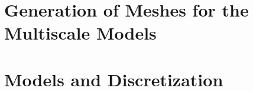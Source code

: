 


\graphicspath{
{images/summer_school_study/png/}
{images/summer_school_study/}
{images/summer_school_study/plots/}
{images/summer_school_study/2018/}
{images/fiber_creation/}
{images/parallel_fiber_estimation/}
{images/motor_unit_assignment/}
{images/implementation/}
{images/theory/}
{images/results/basic}
{images/results/application}
{images/results/studies}
}



\newcommand{\opendihu}{OpenDiHu}
\newcommand{\Opendihu}{OpenDiHu}

\frontmatter

\tableofcontents

\mainmatter




\chapter{Generation of Meshes for the Multiscale Models}\label{sec:generation_of_meshes_for_multiscale}



\chapter{Models and Discretization}

















